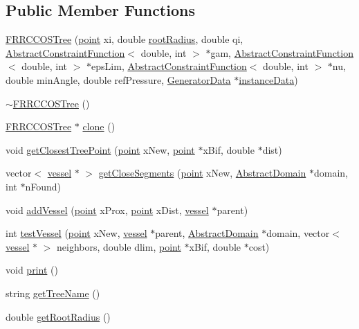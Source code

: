 \subsection*{Public Member Functions}
\begin{DoxyCompactItemize}
\item 
\hyperlink{class_f_r_r_c_c_o_s_tree_a522d48ce9c84769ff85366b9879881ec}{F\+R\+R\+C\+C\+O\+S\+Tree} (\hyperlink{structpoint}{point} xi, double \hyperlink{class_f_r_r_c_c_o_s_tree_a7cbf3091db38b3b573b84be820890bba}{root\+Radius}, double qi, \hyperlink{class_abstract_constraint_function}{Abstract\+Constraint\+Function}$<$ double, int $>$ $\ast$gam, \hyperlink{class_abstract_constraint_function}{Abstract\+Constraint\+Function}$<$ double, int $>$ $\ast$eps\+Lim, \hyperlink{class_abstract_constraint_function}{Abstract\+Constraint\+Function}$<$ double, int $>$ $\ast$nu, double min\+Angle, double ref\+Pressure, \hyperlink{class_generator_data}{Generator\+Data} $\ast$\hyperlink{class_abstract_structured_c_c_o_tree_af1836d7ed2156f3cf9cc311edfdc49b1}{instance\+Data})
\item 
\hyperlink{class_f_r_r_c_c_o_s_tree_a02bbf3ca159fe90abd0a48b9a6fc3ff3}{$\sim$\+F\+R\+R\+C\+C\+O\+S\+Tree} ()
\item 
\hyperlink{class_f_r_r_c_c_o_s_tree}{F\+R\+R\+C\+C\+O\+S\+Tree} $\ast$ \hyperlink{class_f_r_r_c_c_o_s_tree_a5c656f32e41e33023a2b92d82167efb4}{clone} ()
\item 
void \hyperlink{class_f_r_r_c_c_o_s_tree_a9114689c110d03da69c82bf2a833dcae}{get\+Closest\+Tree\+Point} (\hyperlink{structpoint}{point} x\+New, \hyperlink{structpoint}{point} $\ast$x\+Bif, double $\ast$dist)
\item 
vector$<$ \hyperlink{structvessel}{vessel} $\ast$ $>$ \hyperlink{class_f_r_r_c_c_o_s_tree_a51eeb636beadda63f0496ca3385c60f1}{get\+Close\+Segments} (\hyperlink{structpoint}{point} x\+New, \hyperlink{class_abstract_domain}{Abstract\+Domain} $\ast$domain, int $\ast$n\+Found)
\item 
void \hyperlink{class_f_r_r_c_c_o_s_tree_a91c2d539ccbd91c0f07a4366206e01da}{add\+Vessel} (\hyperlink{structpoint}{point} x\+Prox, \hyperlink{structpoint}{point} x\+Dist, \hyperlink{structvessel}{vessel} $\ast$parent)
\item 
int \hyperlink{class_f_r_r_c_c_o_s_tree_af1acf826014beab94a1a177b510cb7df}{test\+Vessel} (\hyperlink{structpoint}{point} x\+New, \hyperlink{structvessel}{vessel} $\ast$parent, \hyperlink{class_abstract_domain}{Abstract\+Domain} $\ast$domain, vector$<$ \hyperlink{structvessel}{vessel} $\ast$ $>$ neighbors, double dlim, \hyperlink{structpoint}{point} $\ast$x\+Bif, double $\ast$cost)
\item 
void \hyperlink{class_f_r_r_c_c_o_s_tree_ae7f3b98fda3d82961e976f908c746852}{print} ()
\item 
string \hyperlink{class_f_r_r_c_c_o_s_tree_a78ad923289d1747b82e5c52a1e79f1f4}{get\+Tree\+Name} ()
\item 
double \hyperlink{class_f_r_r_c_c_o_s_tree_a34f5b4c8888e2254a1f8931d0134874d}{get\+Root\+Radius} ()
\end{DoxyCompactItemize}
